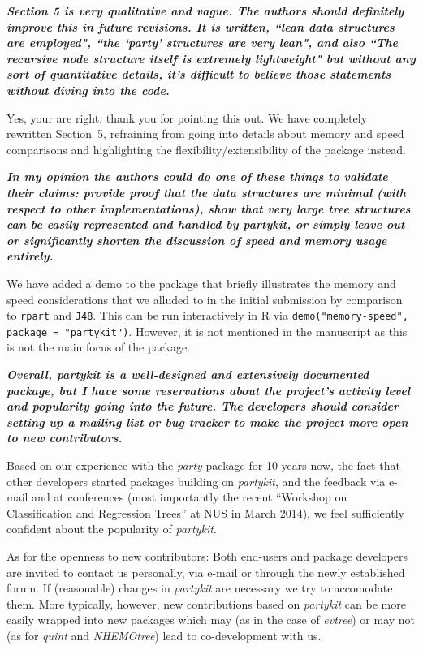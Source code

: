 \documentclass{article}
\begin{document}
\medskip

\textbf{\textit{%
Section 5 is very qualitative and vague.  The authors should definitely
improve this in future revisions.  It is written, ``lean data structures are
employed", ``the `party' structures are very lean", and also ``The recursive
node structure itself is extremely lightweight" but without any sort of
quantitative details, it's difficult to believe those statements without
diving into the code.
}}

\smallskip

Yes, your are right, thank you for pointing this out. We have completely
rewritten Section~5, refraining from going into details about memory and
speed comparisons and highlighting the flexibility/extensibility of the
package instead.

\medskip

\textbf{\textit{%
In my opinion the authors could do one of these things to validate their
claims: provide proof that the data structures are minimal (with respect to
other implementations), show that very large tree structures can be easily
represented and handled by partykit, or simply leave out or significantly
shorten the discussion of speed and memory usage entirely.
}}

\smallskip

We have added a demo to the package that briefly illustrates the
memory and speed considerations that we alluded to in the initial submission
by comparison to \texttt{rpart} and \texttt{J48}.
This can be run interactively in \textsf{R} via
\texttt{demo("memory-speed", package = "partykit")}. However, it is not
mentioned in the manuscript as this is not the main focus of the package.

\medskip

\textbf{\textit{%
Overall, partykit is a well-designed and extensively documented package, but
I have some reservations about the project's activity level and popularity
going into the future.  The developers should consider setting up a mailing
list or bug tracker to make the project more open to new contributors.
}}

\smallskip

Based on our experience with the \emph{party} package for 10 years now, the fact
that other developers started packages building on \emph{partykit}, and the feedback via
e-mail and at conferences (most importantly the recent ``Workshop on Classification
and Regression Trees'' at NUS in March 2014), we feel sufficiently confident
about the popularity of \emph{partykit}.

As for the openness to new contributors: Both end-users and package developers
are invited to contact us personally, via e-mail or through the newly established
forum. If (reasonable) changes in \emph{partykit} are necessary we try to accomodate them.
More typically, however, new contributions based on \emph{partykit} can be more easily
wrapped into new packages which may (as in the case of \emph{evtree}) or may
not (as for \emph{quint} and \emph{NHEMOtree}) lead to co-development with us.



\end{document}
